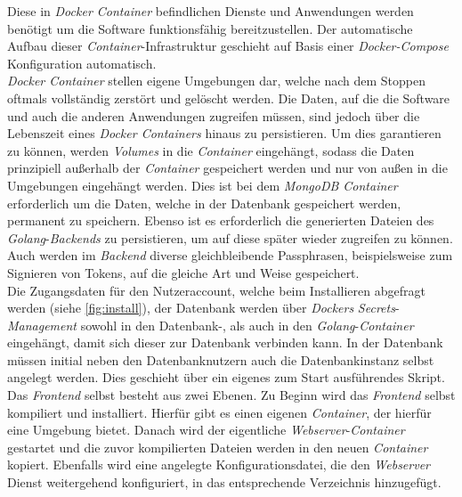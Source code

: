 \newpage

Diese in \textit{Docker Container} befindlichen Dienste und Anwendungen werden benötigt um die Software funktionsfähig bereitzustellen. Der automatische Aufbau dieser \textit{Container}-Infrastruktur geschieht auf Basis einer \textit{Docker-Compose} Konfiguration automatisch. \\

\textit{Docker Container} stellen eigene Umgebungen dar, welche nach dem Stoppen oftmals vollständig zerstört und gelöscht werden. Die Daten, auf die die Software und auch die anderen Anwendungen zugreifen müssen, sind jedoch über die Lebenszeit eines \textit{Docker Containers} hinaus zu persistieren. Um dies garantieren zu können, werden \textit{Volumes} in die \textit{Container} eingehängt, sodass die Daten prinzipiell außerhalb der \textit{Container} gespeichert werden und nur von außen in die Umgebungen eingehängt werden. Dies ist bei dem \textit{MongoDB Container} erforderlich um die Daten, welche in der Datenbank gespeichert werden, permanent zu speichern. Ebenso ist es erforderlich die generierten Dateien des \textit{Golang}-\textit{Backends} zu persistieren, um auf diese später wieder zugreifen zu können. Auch werden im \textit{Backend} diverse gleichbleibende Passphrasen, beispielsweise zum Signieren von Tokens, auf die gleiche Art und Weise gespeichert. \\

Die Zugangsdaten für den Nutzeraccount, welche beim Installieren abgefragt werden (siehe \autoref{fig:install}), der Datenbank werden über \textit{Dockers} \textit{Secrets}-\textit{Management} sowohl in den Datenbank-, als auch in den \textit{Golang}-\textit{Container} eingehängt, damit sich dieser zur Datenbank verbinden kann. In der Datenbank müssen initial neben den Datenbanknutzern auch die Datenbankinstanz selbst angelegt werden. Dies geschieht über ein eigenes zum Start ausführendes Skript. \\

Das \textit{Frontend} selbst besteht aus zwei Ebenen. Zu Beginn wird das \textit{Frontend} selbst kompiliert und installiert. Hierfür gibt es einen eigenen \textit{Container}, der hierfür eine Umgebung bietet. Danach wird der eigentliche \textit{Webserver}-\textit{Container} gestartet und die zuvor kompilierten Dateien werden in den neuen \textit{Container} kopiert. Ebenfalls wird eine angelegte Konfigurationsdatei, die den \textit{Webserver} Dienst weitergehend konfiguriert, in das entsprechende Verzeichnis hinzugefügt.\\


